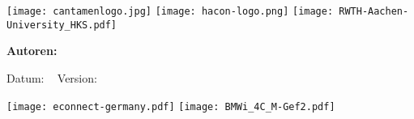 \begin{titlepage}

\begin{center}
\texttt{[image: cantamenlogo.jpg]}
\texttt{[image: hacon-logo.png]}
\texttt{[image: RWTH-Aachen-University\_HKS.pdf]}
\end{center}

\vspace{3em}

\begin{huge}
\bfseries\center
\thistitle

\end{huge}

\vspace{4em}

\begin{large}
\bfseries\noindent Autoren:\\
\thisauthor

\end{large}

\vspace{3em}

Datum: \thisdate ~ Version: \thisversion

\vspace{3em}

\thisabstract

\vfill

\texttt{[image: econnect-germany.pdf]}
\hfill \texttt{[image: BMWi\_4C\_M-Gef2.pdf]}


\end{titlepage}